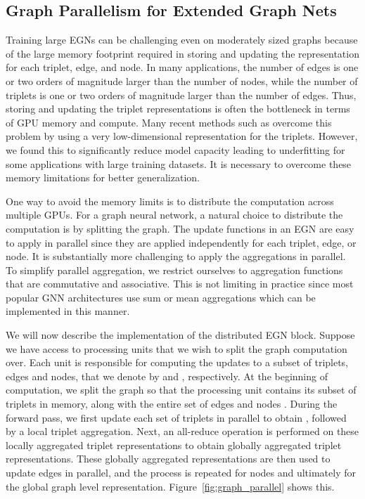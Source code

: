 \documentclass{article} \usepackage{iclr2022_conference,times}
\begin{document}
\subsection{Graph Parallelism for Extended Graph Nets}
\label{sec:gp-egn}

Training large EGNs can be challenging even on moderately sized graphs because of the large memory footprint required in storing and updating the representation for each triplet, edge, and node. In many applications, the number of edges is one or two orders of magnitude larger than the number of nodes, while the number of triplets is one or two orders of magnitude larger than the number of edges. Thus, storing and updating the triplet representations is often the bottleneck in terms of GPU memory and compute. Many recent methods such as \citep{klicpera_dimenetpp_2020,klicpera2021gemnet} overcome this problem by using a very low-dimensional representation for the triplets. However, we found this to significantly reduce model capacity leading to underfitting for some applications with large training datasets. It is necessary to overcome these memory limitations for better generalization.

One way to avoid the memory limits is to distribute the computation across multiple GPUs. For a graph neural network, a natural choice to distribute the computation is by splitting the graph.
The update functions in an EGN are easy to apply in parallel since they are applied independently for each triplet, edge, or node. It is substantially more challenging to apply the aggregations in parallel. To simplify parallel aggregation, we restrict ourselves to aggregation functions that are commutative and associative. This is not limiting in practice since most popular GNN architectures use sum or mean aggregations which can be implemented in this manner.

We will now describe the implementation of the distributed EGN block. Suppose we have access to  processing units that we wish to split the graph computation over. Each unit  is responsible for computing the updates to a subset of triplets, edges and nodes, that we denote by  and , respectively. At the beginning of computation, we split the graph so that the processing unit  contains its subset of triplets  in memory, along with the entire set of edges  and nodes . During the forward pass, we first update each set of triplets  in parallel to obtain , followed by a local triplet aggregation. Next, an all-reduce operation is performed on these locally aggregated triplet representations to obtain globally aggregated triplet representations. These globally aggregated representations are then used to update edges in parallel, and the process is repeated for nodes and ultimately for the global graph level representation.
Figure~\ref{fig:graph_parallel} shows this.
\end{document}
